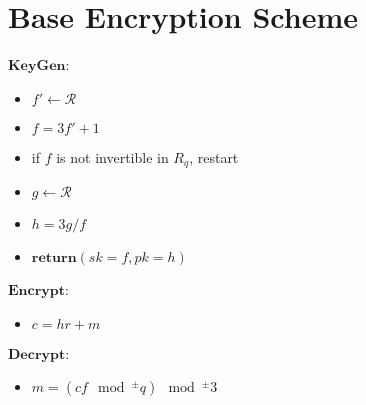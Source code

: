 \documentclass[11pt, letterpaper]{article}
\theoremstyle{definition}
\begin{document}
\section{Base Encryption Scheme}
\begin{description}
    \item $\textbf{KeyGen}$:
    \begin{itemize}
        \item $f' \leftarrow \mathcal{R}$
        \item $f = 3f'+1$
        \item if $f$ is not invertible in $R_q$, restart
        \item $g \leftarrow \mathcal{R}$
        \item $h = 3g/f$
        \item $\textbf{return} (sk=f,pk=h)$
    \end{itemize}
    \item $\textbf{Encrypt}$:
    \begin{itemize}
        \item $c = hr + m$
    \end{itemize}
    \item $\textbf{Decrypt}$:
    \begin{itemize}
        \item $m = (cf \mod^{\pm} q) \mod^{\pm} 3$
    \end{itemize}
\end{description}
\end{document}
